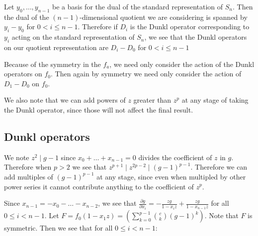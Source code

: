 \documentclass{article}
\numberwithin{equation}{section}
\begin{document}
Let $y_0,\dots,y_{n-1}$ be a basis for the dual of the standard representation of $S_n$. Then the dual of the $(n-1)$-dimensional quotient we are considering is spanned by $y_i-y_0$ for $0 < i \le n-1$. Therefore if $D_i$ is the Dunkl operator corresponding to $y_i$ acting on the standard representation of $S_n$, we see that the Dunkl operators on our quotient representation are $D_i-D_0$ for $0 < i \le n-1$

Because of the symmetry in the $f_a$, we need only consider the action of the Dunkl operators on $f_0$. Then again by symmetry we need only consider the action of $D_1-D_0$ on $f_0$. 

We also note that we can add powers of $z$ greater than $z^p$ at any stage of taking the Dunkl operator, since those will not affect the final result. 





\subsection{Dunkl operators}

We note $z^2 \mid g-1$ since $x_0+\dots+x_{n-1}=0$ divides the coefficient of $z$ in $g$. Therefore when $p > 2$ we see that $z^{p+1} \mid z^{2p-2} \mid (g-1)^{p-1}$. Therefore we can add multiples of $(g-1)^{p-1}$ at any stage, since even when multipled by other power series it cannot contribute anything to the coefficient of $z^p$. 

Since $x_{n-1}=-x_0-\dots-x_{n-2}$, we see that $\frac{\partial g}{\partial x_i}=-\frac{zg}{1-x_iz}+\frac{zg}{1-x_{n-1}z}$ for all $0 \le i < n-1$. Let $F=f_0(1-x_1z)=\left(\sum_{k=0}^{p-1} \binom{c}{k} (g-1)^k\right)$. Note that $F$ is symmetric. Then we see that for all $0 \le i < n-1$:
\end{document}
